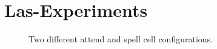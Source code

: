 \section{Las-Experiments}

\begin{figure}
\centering


\caption{Two different attend and spell cell configurations.}
\end{figure}